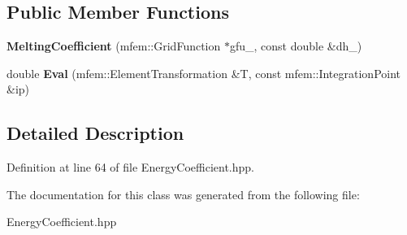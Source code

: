 \subsection*{Public Member Functions}
\begin{DoxyCompactItemize}
\item 
\mbox{\label{classMeltingCoefficient_a670c052e07ed8e87af96cd29e619424c}} 
{\bfseries Melting\+Coefficient} (mfem\+::\+Grid\+Function $\ast$gfu\+\_\+, const double \&dh\+\_\+)
\item 
\mbox{\label{classMeltingCoefficient_a5d4c6be7047e545e16d8d00fa2b45022}} 
double {\bfseries Eval} (mfem\+::\+Element\+Transformation \&T, const mfem\+::\+Integration\+Point \&ip)
\end{DoxyCompactItemize}


\subsection{Detailed Description}


Definition at line 64 of file Energy\+Coefficient.\+hpp.



The documentation for this class was generated from the following file\+:\begin{DoxyCompactItemize}
\item 
Energy\+Coefficient.\+hpp\end{DoxyCompactItemize}
